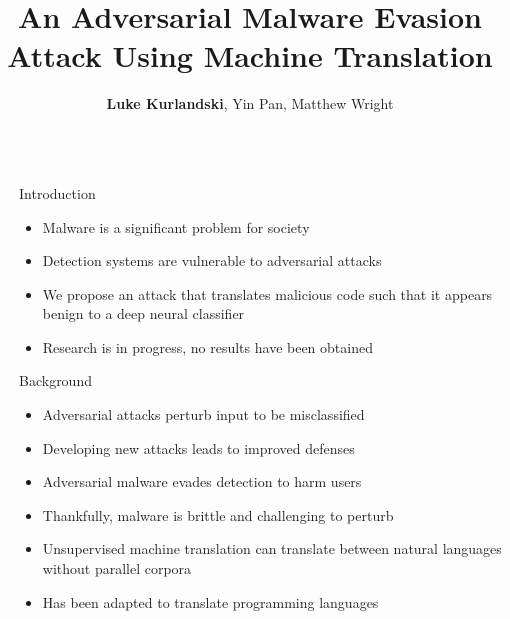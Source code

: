 \documentclass[final,10pt]{beamer}
\title{An Adversarial Malware Evasion Attack Using Machine Translation}
\author{\textbf{Luke Kurlandski}, Yin Pan, Matthew Wright}
\institute[shortinst]{Rochester Institutute of Technology Department of Computing Security}
\newlength{\sepwidth}
\newlength{\colwidth}
\newcommand{\separatorcolumn}{\begin{column}{\sepwidth}\end{column}}
\begin{document}
{
}

\begin{frame}[t]
\begin{columns}[t]
\separatorcolumn

\begin{column}{\colwidth}
	
	\begin{block}{Introduction}
		\begin{itemize}
			\item Malware is a significant problem for society
			\item Detection systems are vulnerable to adversarial attacks
			\item We propose an attack that translates malicious code such that it appears benign to a deep neural classifier
			\item Research is in progress, no results have been obtained
		\end{itemize}
	\end{block}

  \begin{block}{Background}
  	
	\begin{itemize}
		\item Adversarial attacks perturb input to be misclassified
		\item Developing new attacks leads to improved defenses
	\end{itemize}

	\begin{itemize}		
		\item Adversarial malware evades detection to harm users
		\item Thankfully, malware is brittle and challenging to perturb
	\end{itemize}

	\begin{itemize}
		\item Unsupervised machine translation can translate between natural languages without parallel corpora 
		\item Has been adapted to translate programming languages
	\end{itemize}


\end{block}
\end{column}
\end{columns}
\end{frame}
\end{document}
